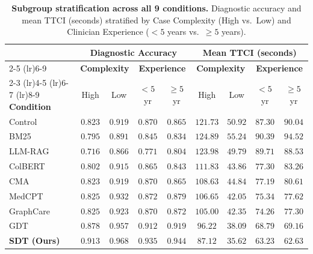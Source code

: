 \documentclass[12pt]{article}
\begin{document}
\vspace{1cm}

\begin{table}[t!]
  \centering
  \caption{\textbf{Subgroup stratification across all 9 conditions.} Diagnostic accuracy and mean TTCI (seconds) stratified by Case Complexity (High vs.\ Low) and Clinician Experience ($<5$ years vs.\ $\ge 5$ years).}
  \label{tab:subgroup_results}
  \small
  \begin{tabular}{@{}lcccccccc@{}}
    \toprule
    & \multicolumn{4}{c}{\textbf{Diagnostic Accuracy}} & \multicolumn{4}{c}{\textbf{Mean TTCI (seconds)}} \\
    \cmidrule(lr){2-5} \cmidrule(lr){6-9}
    & \multicolumn{2}{c}{\textbf{Complexity}} & \multicolumn{2}{c}{\textbf{Experience}} & \multicolumn{2}{c}{\textbf{Complexity}} & \multicolumn{2}{c}{\textbf{Experience}} \\
    \cmidrule(lr){2-3} \cmidrule(lr){4-5} \cmidrule(lr){6-7} \cmidrule(lr){8-9}
    \textbf{Condition} & High & Low & $<5$\,yr & $\ge 5$\,yr & High & Low & $<5$\,yr & $\ge 5$\,yr \\
    \midrule
    Control   & $0.823$ & $0.919$ & $0.870$ & $0.865$ & $121.73$ & $50.92$ & $87.30$ & $90.04$ \\
    BM25      & $0.795$ & $0.891$ & $0.845$ & $0.834$ & $124.89$ & $55.24$ & $90.39$ & $94.52$ \\
    LLM-RAG   & $0.716$ & $0.866$ & $0.771$ & $0.804$ & $123.98$ & $49.79$ & $89.71$ & $88.53$ \\
    ColBERT   & $0.802$ & $0.915$ & $0.865$ & $0.843$ & $111.83$ & $43.86$ & $77.30$ & $83.26$ \\
    CMA       & $0.823$ & $0.919$ & $0.870$ & $0.865$ & $108.63$ & $44.84$ & $77.19$ & $80.61$ \\
    MedCPT    & $0.825$ & $0.932$ & $0.872$ & $0.879$ & $106.65$ & $42.05$ & $75.34$ & $77.62$ \\
    GraphCare & $0.825$ & $0.923$ & $0.870$ & $0.872$ & $105.00$ & $42.35$ & $74.26$ & $77.30$ \\
    GDT       & $0.878$ & $0.957$ & $0.912$ & $0.919$ & $96.22$  & $38.09$ & $68.79$ & $69.16$ \\
    \textbf{SDT (Ours)} & $\mathbf{0.913}$ & $\mathbf{0.968}$ & $\mathbf{0.935}$ & $\mathbf{0.944}$ & $\mathbf{87.12}$ & $\mathbf{35.62}$ & $\mathbf{63.23}$ & $\mathbf{62.63}$ \\
    \bottomrule
  \end{tabular}
\end{table}
\end{document}
